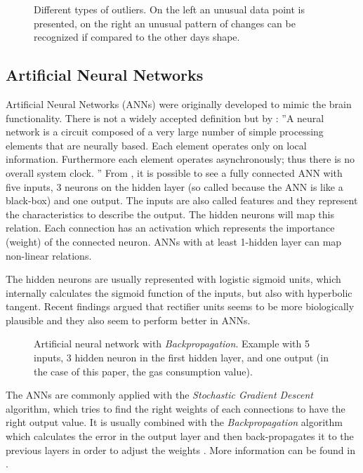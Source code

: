 \documentclass{sig-alternate-sigmod07}
\begin{document}
\begin{figure}[h!]
\centering
{}
\caption{Different types of outliers. On the left an unusual data point is presented, on the right an unusual pattern of changes can be recognized if compared to the other days shape.}
\label{fig:outlierTypes}
\end{figure}


\subsection{Artificial Neural Networks}
Artificial Neural Networks (ANNs) were originally developed to mimic the brain functionality. There is not a widely accepted definition but by \cite{bishop1995neural}: ''A neural network is a circuit composed of a very large number of simple processing elements that are neurally based. Each element operates only on local information. Furthermore each element operates asynchronously; thus there is no overall system clock. '' 
From \label{fig:ANN}, it is possible to see a fully connected ANN with five inputs, 3 neurons on the hidden layer (so called because the ANN is like a black-box) and one output. The inputs are also called features and they represent the characteristics to describe the output. The hidden neurons will map this relation. Each connection has an activation which represents the importance (weight) of the connected neuron. ANNs with at least 1-hidden layer can map non-linear relations.

The hidden neurons are usually represented with logistic sigmoid units, which internally calculates the sigmoid function of the inputs, but also with hyperbolic tangent. Recent findings argued that rectifier units seems to be more biologically plausible \cite{glorot2011deep} and they also seem to perform better in ANNs. 
\begin{figure}[h!]
\label{fig:ANN}
\centering
{}
\caption{Artificial neural network with \emph{Backpropagation}. Example with 5 inputs, 3 hidden neuron in the first hidden layer, and one output (in the case of this paper, the gas consumption value).}
\end{figure}

The ANNs are commonly applied with the \emph{Stochastic Gradient Descent} algorithm, which tries to find the right weights of each connections to have the right output value. It is usually combined with the \emph{Backpropagation} algorithm which calculates the error in the output layer and then back-propagates it to the previous layers in order to adjust the weights \cite{rumelhart1985learning}. More information can be found in \cite{bishop2006pattern}.
\end{document}
